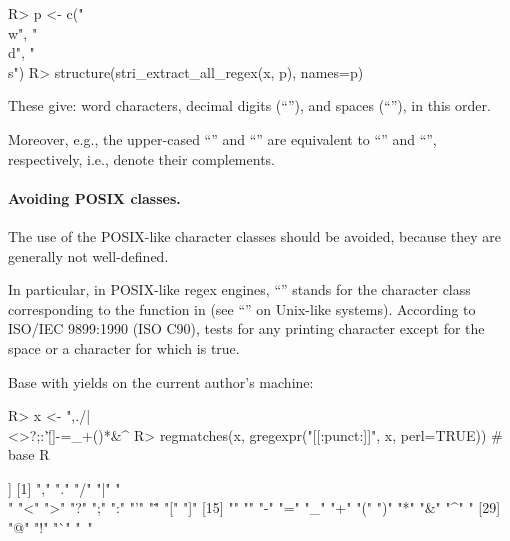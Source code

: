 \documentclass[nojss]{jss}
\begin{document}
\begin{Schunk}
\begin{Sinput}
R> p <- c("\\w", "\\d", "\\s")
R> structure(stri_extract_all_regex(x, p), names=p)
\end{Sinput}
\end{Schunk}

These give: word characters, decimal digits (``''),
and spaces (``''),
in this order.

Moreover, e.g., the upper-cased ``'' and
``'' are equivalent to
``'' and
``\code{[\^{}\textbackslash{}w]}'', respectively, i.e.,
denote their complements.




\paragraph{Avoiding POSIX classes.}
The use of the POSIX-like character classes should be avoided,
because they are generally not well-defined.

In particular, in POSIX-like regex engines, ``\code{[:punct:]}''
stands for the character class corresponding to the 
function in  (see ``'' on Unix-like systems).
According to ISO/IEC 9899:1990 (ISO C90),  tests for
any printing character except for the space or a character for which 
is true.

Base  with  yields on the current
author's machine:

\begin{Schunk}
\begin{Sinput}
R> x <- ",./|\\<>?;:'\"[]{}-=_+()*&^%$€#@!`~×‒„”"
R> regmatches(x, gregexpr("[[:punct:]]",  x, perl=TRUE))  # base R
\end{Sinput}
\begin{Soutput}
[[1]]
 [1] ","  "."  "/"  "|"  "\\" "<"  ">"  "?"  ";"  ":"  "'"  "\"" "["  "]"
[15] "{"  "}"  "-"  "="  "_"  "+"  "("  ")"  "*"  "&"  "^"  "%"  "$"  "#"
[29] "@"  "!"  "`"  "~"
\end{Soutput}
\end{Schunk}
\end{document}
